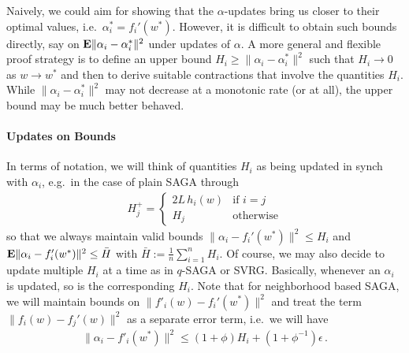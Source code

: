 \documentclass{article}
\newcommand{\E}{{\bf E}}
\begin{document}
Naively, we could aim for showing that the $\alpha$-updates bring us closer to their optimal values, i.e.~$\alpha_i^* = f_i'(w^*)$. However, it is difficult to obtain such bounds directly, say on $\E \| \alpha_i - \alpha_i^*\|^2$ under updates of $\alpha$. A more general and flexible proof strategy is to define an upper bound $H_i \geq \| \alpha_i - \alpha_i^*\|^2$ such that $H_i \to 0$ as $w \to w^*$ and then to derive suitable contractions that involve the quantities $H_i$. While $\| \alpha_i - \alpha_i^*\|^2$ may not decrease at a monotonic rate (or at all), the upper bound may be much better behaved.

\paragraph{Updates on Bounds}
In terms of notation, we will think of quantities $H_i$ as being updated in synch with $\alpha_i$, e.g.~in the case of plain SAGA through
\begin{align}
H_j^+ = 
\begin{cases}
2L \, h_i(w) & \text{if $i=j$} \\
H_j & \text{otherwise}
\end{cases} 
\label{eq:recurrence-h}
\end{align} 
so that we always maintain valid bounds $\| \alpha_i - f_i'(w^*) \|^2 \le H_i$ and $\E\| \alpha_i - f_i'(w^*) \|^2 \le \bar H$ with $\bar H := \frac 1n \sum_{i=1}^n H_i$. Of course, we may also decide to update multiple $H_i$ at a time as in $q$-SAGA or SVRG. Basically, whenever an $\alpha_i$ is updated, so is the corresponding $H_i$.  Note that for neighborhood based SAGA, we will maintain bounds on $\| f'_i(w) - f_i'(w^*) \|^2$ and treat the term $\| f_i(w) - f_j'(w)\|^2$ as a separate error term, i.e.~we will have 
 \begin{align}
\| \alpha_i - f'_i(w^*) \|^2 \leq (1 + \phi) H_i + (1+ \phi^{-1}) \epsilon \,.
 \end{align}
 
\end{document}
